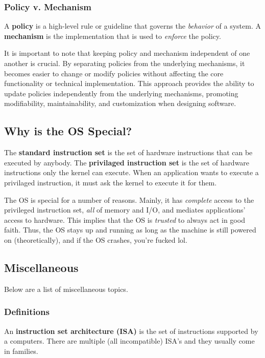 \documentclass{article}
\begin{document}
\subsubsection*{Policy v. Mechanism}
\begin{tcolorbox}[title=Definition: Policy and Mechanism]
  A \textbf{policy} is a high-level rule or guideline that governs the \textit{behavior} of a
  system.
  \tcblower
  A \textbf{mechanism} is the implementation that is used to \textit{enforce} the policy.
\end{tcolorbox}
It is important to note that keeping policy and mechanism independent of one another is crucial. By
separating policies from the underlying mechanisms, it becomes easier to change or modify policies
without affecting the core functionality or technical implementation. This approach provides the
ability to update policies independently from the underlying mechanisms, promoting modifiability,
maintainability, and customization when designing software.


\subsection{Why is the OS Special?}
\begin{tcolorbox}[title=Definition: Standard and Privileged Instruction Set]
  The \textbf{standard instruction set} is the set of hardware instructions that can be executed by anybody.
  \tcblower
  The \textbf{privilaged instruction set} is the set of hardware instructions only the kernel can
  execute. When an application wants to execute a privilaged instruction, it must ask the kernel to
  execute it for them.
\end{tcolorbox}

The OS is special for a number of reasons. Mainly, it has \textit{complete} access to the privileged
instruction set, \textit{all} of memory and I/O, and mediates applications' access to
hardware. This implies that the OS is \textit{trusted} to always act in good faith. Thus, the OS
stays up and running as long as the machine is still powered on (theoretically), and if the OS crashes,
you're fucked lol.


\subsection{Miscellaneous}
Below are a list of miscellaneous topics.
\subsubsection{Definitions}
\begin{tcolorbox}[title=Definition: Instruction Set Architectures]
  An \textbf{instruction set architecture (ISA)} is the set of instructions supported by a
  computers. There are multiple (all incompatible) ISA's and they usually come in families.
\end{tcolorbox}
\end{document}
